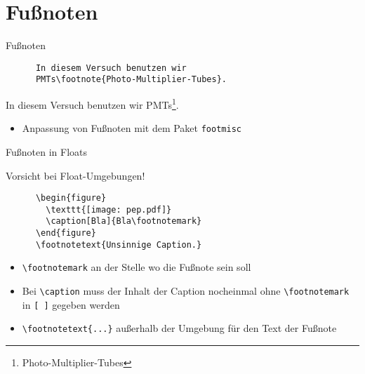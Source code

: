 \section{Fußnoten}

\begin{frame}[fragile]{Fußnoten}
  \begin{CodeExample}{0.5}
    \begin{lstlisting}
      In diesem Versuch benutzen wir
      PMTs\footnote{Photo-Multiplier-Tubes}.
    \end{lstlisting}
    \CodeResult
    In diesem Versuch benutzen wir PMTs\footnote{Photo-Multiplier-Tubes}.
  \end{CodeExample}
  \begin{itemize}
    \item Anpassung von Fußnoten mit dem Paket \texttt{footmisc}
  \end{itemize}
\end{frame}
\begin{frame}[fragile]{Fußnoten in Floats}
  \begin{alertblock}{Vorsicht bei Float-Umgebungen!}
    \begin{lstlisting}
      \begin{figure}
        \texttt{[image: pep.pdf]}
        \caption[Bla]{Bla\footnotemark}
      \end{figure}
      \footnotetext{Unsinnige Caption.}
    \end{lstlisting}
  \end{alertblock}
  \vspace{-1pt}
  \begin{itemize}
    \item \lstinline+\footnotemark+ an der Stelle wo die Fußnote sein soll
    \item Bei \lstinline+\caption+ muss der Inhalt der Caption nocheinmal
        ohne \lstinline+\footnotemark+ in \lstinline+[ ]+ gegeben werden
    \item \lstinline+\footnotetext{...}+ außerhalb der Umgebung für den Text der Fußnote
  \end{itemize}
\end{frame}

